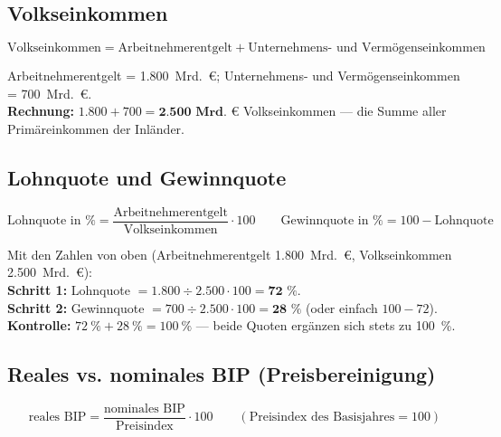 \documentclass[11pt, a4paper]{article}
\begin{document}
\subsection{Volkseinkommen}

\begin{merksatz}[title={\bfseries Formel: Volkseinkommen}]
\[
\text{Volkseinkommen} = \text{Arbeitnehmerentgelt}
+ \text{Unternehmens- und Vermögenseinkommen}
\]
\end{merksatz}

\begin{beispiel}
Arbeitnehmerentgelt = 1.800~Mrd.~€; Unternehmens- und Vermögenseinkommen = 700~Mrd.~€.\\
\textbf{Rechnung:} $1.800 + 700 = \textbf{2.500~Mrd.~€}$ Volkseinkommen ---
die Summe aller Primäreinkommen der Inländer.
\end{beispiel}

\subsection{Lohnquote und Gewinnquote}

\begin{merksatz}[title={\bfseries Formeln: Lohnquote und Gewinnquote}]
\[
\text{Lohnquote in \%} = \frac{\text{Arbeitnehmerentgelt}}{\text{Volkseinkommen}} \cdot 100
\qquad
\text{Gewinnquote in \%} = 100 - \text{Lohnquote}
\]
\end{merksatz}

\begin{beispiel}
Mit den Zahlen von oben (Arbeitnehmerentgelt 1.800~Mrd.~€, Volkseinkommen
2.500~Mrd.~€):\\[0.3em]
\textbf{Schritt 1:} Lohnquote $= 1.800 \div 2.500 \cdot 100 = \textbf{72~\%}$.\\
\textbf{Schritt 2:} Gewinnquote $= 700 \div 2.500 \cdot 100 = \textbf{28~\%}$
(oder einfach $100 - 72$).\\
\textbf{Kontrolle:} $72~\% + 28~\% = 100~\%$ --- beide Quoten ergänzen sich stets zu 100~\%.
\end{beispiel}

\subsection{Reales vs. nominales BIP (Preisbereinigung)}

\begin{merksatz}[title={\bfseries Formel: reales BIP}]
\[
\text{reales BIP} = \frac{\text{nominales BIP}}{\text{Preisindex}} \cdot 100
\qquad (\text{Preisindex des Basisjahres} = 100)
\]
\end{merksatz}
\end{document}

